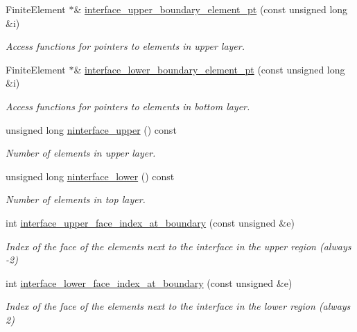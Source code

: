 \begin{DoxyCompactItemize}
Finite\+Element $\ast$\& \hyperlink{classElasticTwoLayerMesh_a5170e0a70ad0d4eb3ec01c32d3db2c72}{interface\+\_\+upper\+\_\+boundary\+\_\+element\+\_\+pt} (const unsigned long \&i)
\begin{DoxyCompactList}\small\item\em Access functions for pointers to elements in upper layer. \end{DoxyCompactList}\item 
Finite\+Element $\ast$\& \hyperlink{classElasticTwoLayerMesh_a748ff5229092301a18a193a846d2ebdd}{interface\+\_\+lower\+\_\+boundary\+\_\+element\+\_\+pt} (const unsigned long \&i)
\begin{DoxyCompactList}\small\item\em Access functions for pointers to elements in bottom layer. \end{DoxyCompactList}\item 
unsigned long \hyperlink{classElasticTwoLayerMesh_a6e813329601844d3d900d78a60892134}{ninterface\+\_\+upper} () const
\begin{DoxyCompactList}\small\item\em Number of elements in upper layer. \end{DoxyCompactList}\item 
unsigned long \hyperlink{classElasticTwoLayerMesh_ae5db5553497593905fd227bfc5b34b50}{ninterface\+\_\+lower} () const
\begin{DoxyCompactList}\small\item\em Number of elements in top layer. \end{DoxyCompactList}\item 
int \hyperlink{classElasticTwoLayerMesh_a074aafe34f7dd56566c1a9ff934505d5}{interface\+\_\+upper\+\_\+face\+\_\+index\+\_\+at\+\_\+boundary} (const unsigned \&e)
\begin{DoxyCompactList}\small\item\em Index of the face of the elements next to the interface in the upper region (always -\/2) \end{DoxyCompactList}\item 
int \hyperlink{classElasticTwoLayerMesh_a100b3b26d4a2b97f67b0bef4e4b42e64}{interface\+\_\+lower\+\_\+face\+\_\+index\+\_\+at\+\_\+boundary} (const unsigned \&e)
\begin{DoxyCompactList}\small\item\em Index of the face of the elements next to the interface in the lower region (always 2) \end{DoxyCompactList}\end{DoxyCompactItemize}
